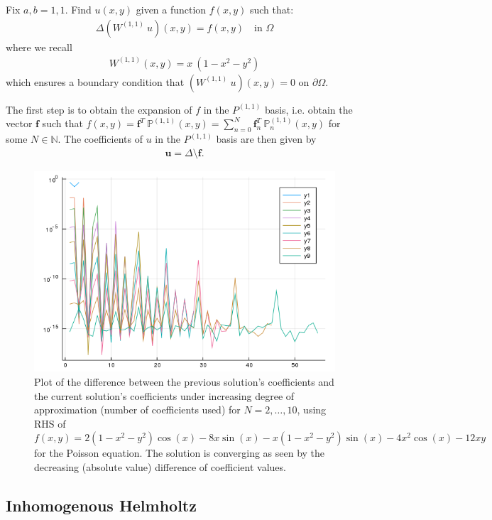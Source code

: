 \documentclass[11pt, oneside]{article}   	%
\newcommand{\N}{\mathbb{N}}
\newcommand{\bigP}{\mathbb{P}}
\newcommand{\Wii}{W^{(1,1)}}
\newcommand{\Pii}{P^{(1,1)}}
\begin{document}
Fix \(a, b = 1,1\). Find \(u(x,y)\) given a function \(f(x,y)\) such that:
\begin{align}
    \Delta(\Wii \: u)(x,y) = f(x,y) \quad \text{in } \Omega
\end{align}
    where we recall
\begin{align}
    \Wii(x,y) = x \: (1-x^2-y^2)
\end{align}
which ensures a boundary condition that \((\Wii \: u)(x,y) = 0\) on \(\partial \Omega\).

The first step is to obtain the expansion of \(f\) in the \(\Pii\) basis, i.e. obtain the vector \(\mathbf{f}\) such that \(f(x,y) = \mathbf{f}^T \: \bigP^{(1,1)}(x,y) = \sum_{n=0}^N \mathbf{f}_n^T \: \bigP_n^{(1,1)}(x,y)\) for some \(N \in \N\). The coefficients of \(u\) in the \(\Pii\) basis are then given by 
\begin{align}
    \mathbf{u} = \Delta \text{\textbackslash} \mathbf{f}.
\end{align}

\begin{figure}
	\includegraphics[scale=0.4]{example4coeffs}
\centering
\caption{Plot of the difference between the previous solution's coefficients and the current solution's coefficients under increasing degree of approximation (number of coefficients used) for $N = 2,\dots,10$, using RHS of $f(x,y) = 2(1-x^2-y^2)\cos(x) - 8x\sin(x) - x(1-x^2-y^2)\sin(x) - 4x^2 \cos(x) - 12xy$ for the Poisson equation. The solution is converging as seen by the decreasing (absolute value) difference of coefficient values.}
\centering
\label{fig:poisson}
\end{figure}


\subsection{Inhomogenous Helmholtz}
\end{document}
